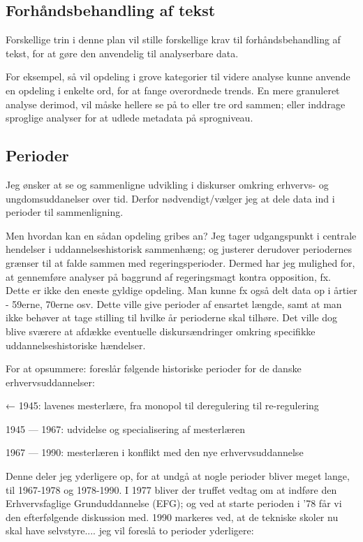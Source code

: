 \subsection{Forhåndsbehandling af tekst}

Forskellige trin i denne plan vil stille forskellige krav til forhåndsbehandling af tekst, for at gøre den anvendelig til analyserbare data.

For eksempel, så vil opdeling i grove kategorier til videre analyse kunne anvende en opdeling i enkelte ord, for at fange overordnede trends.
En mere granuleret analyse derimod, vil måske hellere se på to eller tre ord sammen; eller inddrage sproglige analyser for at udlede metadata på sprogniveau.


\subsection{Perioder}\label{sec:periods}
Jeg ønsker at se og sammenligne udvikling i diskurser omkring erhvervs- og ungdomsuddanelser over tid.
Derfor nødvendigt/vælger jeg at dele data ind i perioder til sammenligning.

Men hvordan kan en sådan opdeling gribes an?
Jeg tager udgangspunkt i centrale hendelser i uddannelseshistorisk sammenhæng; og justerer derudover periodernes grænser til at falde sammen med regeringsperioder.
Dermed har jeg mulighed for, at gennemføre analyser på baggrund af regeringsmagt kontra opposition, fx.
Dette er ikke den eneste gyldige opdeling.
Man kunne fx også delt data op i årtier - 59erne, 70erne osv.
Dette ville give perioder af ensartet længde, samt at man ikke behøver at tage stilling til hvilke år perioderne skal tilhøre.
Det ville dog blive sværere at afdække eventuelle diskursændringer omkring specifikke uddannelseshistoriske hændelser.

For at opsummere: \citeauthor{bondergaardHistoricalEmergenceKey2014} foreslår følgende historiske perioder for de danske erhvervsuddannelser:

← 1945: lavenes mesterlære, fra monopol til deregulering til re-regulering

1945 --- 1967: udvidelse og specialisering af mesterlæren

1967 --- 1990: mesterlæren i konflikt med den nye erhvervsuddannelse

Denne deler jeg yderligere op, for at undgå at nogle perioder bliver meget lange, til 1967-1978 og 1978-1990.
I 1977 bliver der truffet vedtag om at indføre den Erhvervsfaglige Grunduddannelse (EFG); og ved at starte perioden i '78 får vi den efterfølgende diskussion med.
1990 markeres ved, at de tekniske skoler nu skal have selvstyre....
jeg vil foreslå to perioder yderligere:

